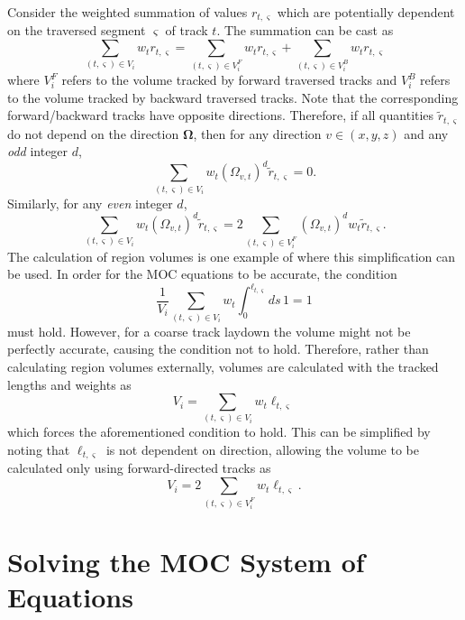 Consider the weighted summation of values $r_{t,\varsigma}$ which are potentially dependent on the traversed segment $\varsigma$ of track $t$. The summation can be cast as
\begin{equation}
	\sum_{(t,\varsigma) \in V_i} w_t r_{t,\varsigma} = \sum_{(t,\varsigma) \in V^F_i} w_t r_{t,\varsigma} + \sum_{(t,\varsigma) \in V^B_i} w_t r_{t,\varsigma}
\end{equation}
where $V^F_i$ refers to the volume tracked by forward traversed tracks and $V^B_i$ refers to the volume tracked by backward traversed tracks. Note that the corresponding forward/backward tracks have opposite directions. Therefore, if all quantities $\tilde{r}_{t,\varsigma}$ do not depend on the direction $\mathbf{\Omega}$, then for any direction $v \in (x,y,z)$ and any \textit{odd} integer $d$,
\begin{equation}
\sum_{(t,\varsigma) \in V_i} w_t \left(\Omega_{v,t}\right)^d \tilde{r}_{t,\varsigma} = 0.
\end{equation}
Similarly, for any \textit{even} integer $d$,
\begin{equation}
\sum_{(t,\varsigma) \in V_i} w_t \left(\Omega_{v,t}\right)^d \tilde{r}_{t,\varsigma} = 2 \sum_{(t,\varsigma) \in V^F_i} \left(\Omega_{v,t}\right)^d w_t \tilde{r}_{t,\varsigma}.
\end{equation}
The calculation of region volumes is one example of where this simplification can be used. In order for the \ac{MOC} equations to be accurate, the condition
\begin{dmath}
	\frac{1}{V_i} \sum_{(t,\varsigma) \in V_i} w_{t} \int_{0}^{\ell_{t,\varsigma}} ds \, 1 = 1
\end{dmath}
must hold. However, for a coarse track laydown the volume might not be perfectly accurate, causing the condition not to hold. Therefore, rather than calculating region volumes externally, volumes are calculated with the tracked lengths and weights as
\begin{dmath}
	V_i = \sum_{(t,\varsigma) \in V_i} w_{t} \ell_{t,\varsigma}
\end{dmath}
which forces the aforementioned condition to hold. This can be simplified by noting that $\ell_{t,\varsigma}$ is not dependent on direction, allowing the volume to be calculated only using forward-directed tracks as
\begin{equation}
V_i = 2 \sum_{(t,\varsigma) \in V^F_i} w_{t} \ell_{t,\varsigma}.
\end{equation}

\section{Solving the MOC System of Equations}
\label{sec:moc-solve}

